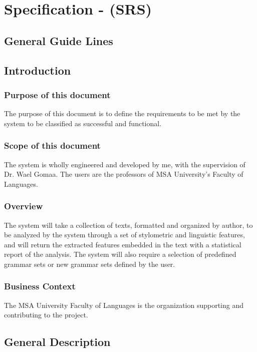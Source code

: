 \chapter{Specification - (SRS)}

\section{General Guide Lines}

\section{Introduction}
\subsection{Purpose of this document}
The purpose of this document is to define the requirements to be met by the system to be classified as successful and functional.
\subsection{Scope of this document}
The system is wholly engineered and developed by me, with the supervision of Dr. Wael Gomaa. The users are the professors of MSA University's Faculty of Languages.

\subsection{Overview}
The system will take a collection of texts, formatted and organized by author, to be analyzed by the system through a set of stylometric and linguistic features, and will return the extracted features embedded in the text with a statistical report of the analysis. The system will also require a selection of predefined grammar sets or new grammar sets defined by the user.

\subsection{Business Context}
The MSA University Faculty of Languages is the organization supporting and contributing to the project.

\section{General Description}
